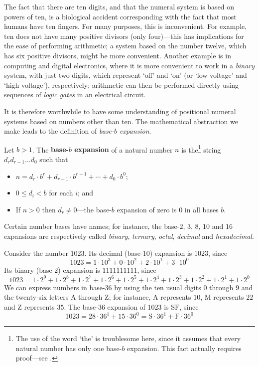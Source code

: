The fact that there are ten digits, and that the numeral system is based on powers of ten, is a biological accident corresponding with the fact that most humans have ten fingers. For many purposes, this is inconvenient. For example, ten does not have many positive divisors (only four)---this has implications for the ease of performing arithmetic; a system based on the number twelve, which has six positive divisors, might be more convenient. Another example is in computing and digital electronics, where it is more convenient to work in a \textit{binary} system, with just two digits, which represent `off' and `on' (or `low voltage' and `high voltage'), respectively; arithmetic can then be performed directly using sequences of \textit{logic gates} in an electrical circuit.

It is therefore worthwhile to have some understanding of positional numeral systems based on numbers other than ten. The mathematical abstraction we make leads to the definition of \textit{base-$b$ expansion}.

\begin{definition}
\label{defBaseBExpansionPreliminary}
Let $b>1$. The \textbf{base-$b$ expansion} of a natural number $n$ is the\footnote{The use of the word `the' is troublesome here, since it assumes that every natural number has only one base-$b$ expansion. This fact actually requires proof---see .} string $d_r d_{r-1} \dots d_0$ such that
\begin{itemize}
\item $n = d_r \cdot b^r + d_{r-1} \cdot b^{r-1} + \cdots + d_0 \cdot b^0$;
\item $0 \le d_i < b$ for each $i$; and
\item If $n>0$ then $d_r \ne 0$---the base-$b$ expansion of zero is $0$ in all bases $b$.
\end{itemize}
Certain number bases have names; for instance, the base-$2$, $3$, $8$, $10$ and $16$ expansions are respectively called \textit{binary}, \textit{ternary}, \textit{octal}, \textit{decimal} and \textit{hexadecimal}.
\end{definition}

\begin{example}
Consider the number $1023$. Its decimal (base-$10$) expansion is $1023$, since
\[ 1023 = 1 \cdot 10^3 + 0 \cdot 10^2 + 2 \cdot 10^1 + 3 \cdot 10^0 \]
Its binary (base-$2$) expansion is $1111111111$, since
\[ 1023 = 1 \cdot 2^9 + 1 \cdot 2^8 + 1 \cdot 2^7 + 1 \cdot 2^6 + 1 \cdot 2^5 + 1 \cdot 2^4 + 1 \cdot 2^3 + 1 \cdot 2^2 + 1 \cdot 2^1 + 1 \cdot 2^0 \]
We can express numbers in base-$36$ by using the ten usual digits $0$ through $9$ and the twenty-six letters $\mathrm{A}$ through $\mathrm{Z}$; for instance, $\mathrm{A}$ represents $10$, $\mathrm{M}$ represents $22$ and $\mathrm{Z}$ represents $35$. The base-$36$ expansion of $1023$ is $\mathrm{SF}$, since
\[ 1023 = 28 \cdot 36^1 + 15 \cdot 36^0 = \mathrm{S} \cdot 36^1 + \mathrm{F} \cdot 36^0 \]
\end{example}

